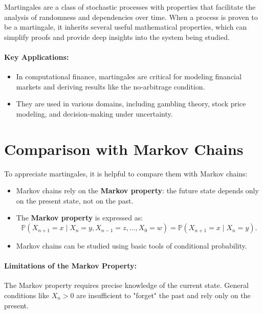 Martingales are a class of stochastic processes with properties that facilitate the analysis of randomness and dependencies over time. When a process is proven to be a martingale, it inherits several useful mathematical properties, which can simplify proofs and provide deep insights into the system being studied.

\paragraph{Key Applications:}
\begin{itemize}
    \item In computational finance, martingales are critical for modeling financial markets and deriving results like the no-arbitrage condition.
    \item They are used in various domains, including gambling theory, stock price modeling, and decision-making under uncertainty.
\end{itemize}

\section{Comparison with Markov Chains}
To appreciate martingales, it is helpful to compare them with Markov chains:
\begin{itemize}
    \item Markov chains rely on the \textbf{Markov property}: the future state depends only on the present state, not on the past.
    \item The \textbf{Markov property} is expressed as:
    \[
    \mathbb{P}(X_{n+1} = x \mid X_n = y, X_{n-1} = z, \dots, X_0 = w) = \mathbb{P}(X_{n+1} = x \mid X_n = y).
    \]
    \item Markov chains can be studied using basic tools of conditional probability.
\end{itemize}

\paragraph{Limitations of the Markov Property:}
The Markov property requires precise knowledge of the current state. General conditions like \( X_n > 0 \) are insufficient to "forget" the past and rely only on the present.

